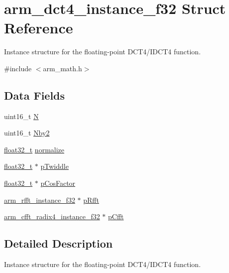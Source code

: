 \hypertarget{structarm__dct4__instance__f32}{}\section{arm\+\_\+dct4\+\_\+instance\+\_\+f32 Struct Reference}
\label{structarm__dct4__instance__f32}


Instance structure for the floating-\/point D\+C\+T4/\+I\+D\+C\+T4 function.  




{\ttfamily \#include $<$arm\+\_\+math.\+h$>$}

\subsection*{Data Fields}
\begin{DoxyCompactItemize}
\item 
uint16\+\_\+t \hyperlink{structarm__dct4__instance__f32_a37d49571fe35012087153c093705cd11}{N}
\item 
uint16\+\_\+t \hyperlink{structarm__dct4__instance__f32_afa64b1618089e35c2b55cff71cb29715}{Nby2}
\item 
\hyperlink{arm__math_8h_a4611b605e45ab401f02cab15c5e38715}{float32\+\_\+t} \hyperlink{structarm__dct4__instance__f32_a1bf2ed86ef2c3dd83af606bb3f520f2a}{normalize}
\item 
\hyperlink{arm__math_8h_a4611b605e45ab401f02cab15c5e38715}{float32\+\_\+t} $\ast$ \hyperlink{structarm__dct4__instance__f32_aca581481fccdff0f557f54a3ef20d967}{p\+Twiddle}
\item 
\hyperlink{arm__math_8h_a4611b605e45ab401f02cab15c5e38715}{float32\+\_\+t} $\ast$ \hyperlink{structarm__dct4__instance__f32_abd73b9d7fb4951ba086e4820c2a48eb0}{p\+Cos\+Factor}
\item 
\hyperlink{structarm__rfft__instance__f32}{arm\+\_\+rfft\+\_\+instance\+\_\+f32} $\ast$ \hyperlink{structarm__dct4__instance__f32_ad4cd7c85eea3f7c5fff4630bbd979e6a}{p\+Rfft}
\item 
\hyperlink{structarm__cfft__radix4__instance__f32}{arm\+\_\+cfft\+\_\+radix4\+\_\+instance\+\_\+f32} $\ast$ \hyperlink{structarm__dct4__instance__f32_ab7bd4d374a1780dea50efd3e7ac220be}{p\+Cfft}
\end{DoxyCompactItemize}


\subsection{Detailed Description}
Instance structure for the floating-\/point D\+C\+T4/\+I\+D\+C\+T4 function. 

